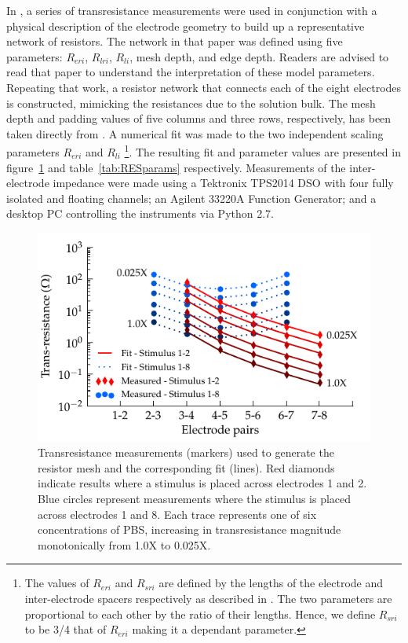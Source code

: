 \documentclass[journal, a4paper]{IEEEtran}
\begin{document}
In \cite{ScottSingle2013}, a series of transresistance measurements were used in conjunction with a physical description of the electrode geometry to build up a representative network of resistors. The network in that paper was defined using five parameters: $R_{eri}$, $R_{lri}$, $R_{li}$, mesh depth, and edge depth. Readers are advised to read that paper to understand the interpretation of these model parameters. Repeating that work, a resistor network that connects each of the eight electrodes is constructed, mimicking the resistances due to the solution bulk.
{
    \color{blue}
The mesh depth and padding values of five columns and three rows, respectively, has been taken directly from \cite{ScottSingle2013}.
A numerical fit was made to the two independent scaling parameters $R_{eri}$ and $R_{li}$
\footnote{The values of $R_{eri}$ and $R_{sri}$ are defined by the lengths of the electrode and inter-electrode spacers respectively as described in \cite{ScottSingle2013}. The two parameters are proportional to each other by the ratio of their lengths. Hence, we define $R_{sri}$ to be 3/4 that of $R_{eri}$ making it a dependant parameter.}.
}
The resulting fit and parameter values are presented in figure~\ref{fig:transresistance} and table~\ref{tab:RESparams} respectively. 
{
    \color{blue}
Measurements of the inter-electrode impedance were made using a Tektronix TPS2014 DSO with four fully isolated and floating channels; an Agilent 33220A Function Generator; and a desktop PC controlling the instruments via Python 2.7.
}

\begin{figure}
    \begin{center}
        \includegraphics{graphics/pbs_transimpedance_IEEE}
    \end{center}
    \caption{Transresistance measurements (markers) used to generate the resistor mesh and the corresponding fit (lines). Red diamonds indicate results where a stimulus is placed across electrodes 1 and 2. Blue circles represent measurements where the stimulus is placed across electrodes 1 and 8. Each trace represents one of six concentrations of PBS, increasing in transresistance magnitude monotonically from 1.0X to 0.025X.}
    \label{fig:transresistance}
\end{figure}
\end{document}
